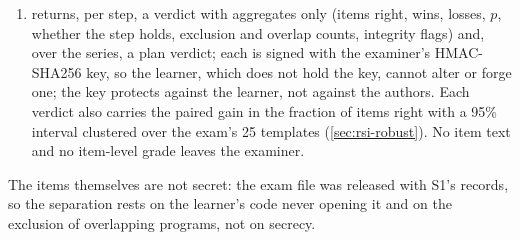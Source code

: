 \begin{enumerate}
  predecessor wrong; a loss: the reverse), computes the exact one-sided sign test over the discordant
  items, and decides the registered rule: a step holds when wins exceed losses at $p<0.05$, a lineage
  succeeds when all three of its steps hold, and the series meets its criterion when at least three of
  the four lineages succeed;
\item returns, per step, a verdict with aggregates only (items right, wins, losses, $p$, whether the
  step holds, exclusion and overlap counts, integrity flags) and, over the series, a plan verdict;
  each is signed with the examiner's HMAC-SHA256 key, so the learner, which does not hold the key,
  cannot alter or forge one; the key protects against the learner, not against the authors. Each verdict
  also carries the paired gain in the fraction of items right with a 95\% interval clustered over the
  exam's 25 templates (\cref{sec:rsi-robust}). No item text and no item-level grade leaves the
  examiner.
\end{enumerate}
The items themselves are not secret: the exam file was released with S1's records, so the
separation rests on the learner's code never opening it and on the exclusion of overlapping programs,
not on secrecy.


